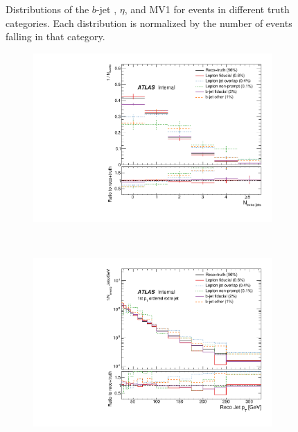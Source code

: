 \begin{figure}
\begin{subfigure}[]{0.45\textwidth}
\end{subfigure}
\caption{Distributions of the $b$-jet \pt, $\eta$, and MV1 for events in different truth categories. Each distribution is normalized by the number of events falling in that category. }
\label{fig:fakebjet}
\end{figure}

\begin{figure}
\centering
\begin{subfigure}[]{0.3\textwidth}
\includegraphics[width=\textwidth]{fig/RecoNotTruth/NJets.pdf}
\end{subfigure}
~
\begin{subfigure}[]{0.3\textwidth}
\includegraphics[width=\textwidth]{fig/RecoNotTruth/RecoPtJet0.pdf}
\end{subfigure}
~
\begin{subfigure}[]{0.3\textwidth}

\end{subfigure}
\end{figure}
